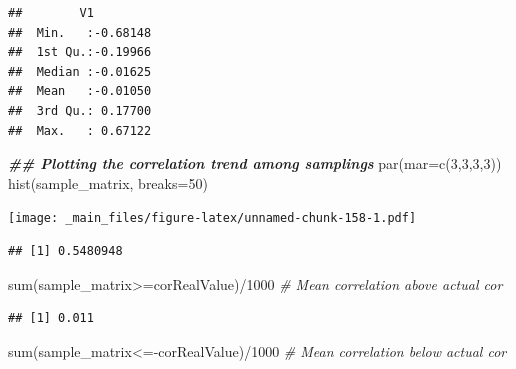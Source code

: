 \documentclass[
  notitlepage,
  onecolumn,
  openany]{book}
\newenvironment{Shaded}{\begin{snugshade}}{\end{snugshade}}
\newcommand{\AttributeTok}[1]{\textcolor[rgb]{0.77,0.63,0.00}{#1}}
\newcommand{\CommentTok}[1]{\textcolor[rgb]{0.56,0.35,0.01}{\textit{#1}}}
\newcommand{\DecValTok}[1]{\textcolor[rgb]{0.00,0.00,0.81}{#1}}
\newcommand{\DocumentationTok}[1]{\textcolor[rgb]{0.56,0.35,0.01}{\textbf{\textit{#1}}}}
\newcommand{\FunctionTok}[1]{\textcolor[rgb]{0.00,0.00,0.00}{#1}}
\newcommand{\NormalTok}[1]{#1}
\newcommand{\OtherTok}[1]{\textcolor[rgb]{0.56,0.35,0.01}{#1}}
\newcommand{\SpecialCharTok}[1]{\textcolor[rgb]{0.00,0.00,0.00}{#1}}
\begin{document}
\begin{verbatim}
##        V1          
##  Min.   :-0.68148  
##  1st Qu.:-0.19966  
##  Median :-0.01625  
##  Mean   :-0.01050  
##  3rd Qu.: 0.17700  
##  Max.   : 0.67122
\end{verbatim}

\begin{Shaded}
\begin{Highlighting}[]
\DocumentationTok{\#\# Plotting the correlation trend among samplings}
\FunctionTok{par}\NormalTok{(}\AttributeTok{mar=}\FunctionTok{c}\NormalTok{(}\DecValTok{3}\NormalTok{,}\DecValTok{3}\NormalTok{,}\DecValTok{3}\NormalTok{,}\DecValTok{3}\NormalTok{))}
\FunctionTok{hist}\NormalTok{(sample\_matrix, }\AttributeTok{breaks=}\DecValTok{50}\NormalTok{)}
\end{Highlighting}
\end{Shaded}

\texttt{[image: \_main\_files/figure-latex/unnamed-chunk-158-1.pdf]}

\begin{Shaded}
\end{Shaded}

\begin{verbatim}
## [1] 0.5480948
\end{verbatim}

\begin{Shaded}
\begin{Highlighting}[]
\FunctionTok{sum}\NormalTok{(sample\_matrix}\SpecialCharTok{\textgreater{}=}\NormalTok{corRealValue)}\SpecialCharTok{/}\DecValTok{1000} \CommentTok{\# Mean correlation above actual cor}
\end{Highlighting}
\end{Shaded}

\begin{verbatim}
## [1] 0.011
\end{verbatim}

\begin{Shaded}
\begin{Highlighting}[]
\FunctionTok{sum}\NormalTok{(sample\_matrix}\SpecialCharTok{\textless{}={-}}\NormalTok{corRealValue)}\SpecialCharTok{/}\DecValTok{1000} \CommentTok{\# Mean correlation below actual cor}
\end{Highlighting}
\end{Shaded}
\end{document}
